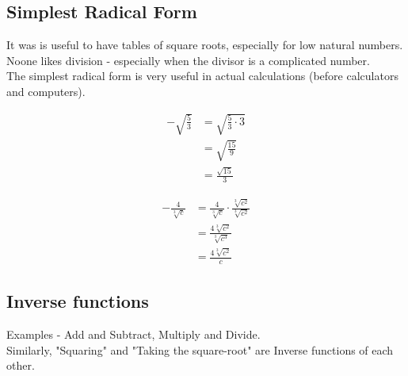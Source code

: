 \documentclass{hw}
\begin{document}
\subsection*{\normalsize Simplest Radical Form}
It was is useful to have tables of square roots, especially for low natural numbers. \\
Noone likes division - especially when the divisor is a complicated number. \\
The simplest radical form is very useful in actual calculations (before calculators and computers).

{\centering
{}
\par}

\begin{minipage}{0.5\textwidth}
\centering
    \begin{align*}
        -\sqrt{\frac{5}{3}} &= \sqrt{\frac{5}{3} \cdot 3} \\
                            &= \sqrt{\frac{15}{9}} \\
                            &= \frac{\sqrt{15}}{3}
    \end{align*}
\end{minipage}
\begin{minipage}{0.5\textwidth}
\centering
    \begin{align*}
        -\frac{4}{\sqrt[3]{c}} &= \frac{4}{\sqrt[3]{c}} \cdot \frac{\sqrt[3]{c^2}}{\sqrt[3]{c^2}} \\
                               &= \frac{4 \sqrt[3]{c^2}}{\sqrt[3]{c^3}} \\
                               &= \frac{4 \sqrt[3]{c^2}}{c}
    \end{align*}
\end{minipage}

\subsection*{\normalsize Inverse functions}
Examples - Add and Subtract, Multiply and Divide. \\
Similarly, "Squaring" and "Taking the square-root" are Inverse functions of each other.
\end{document}
